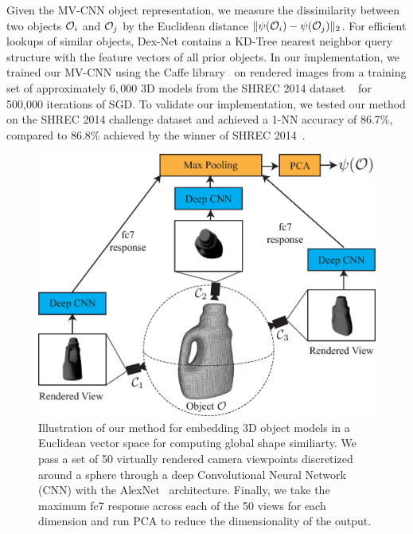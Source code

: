 Given the MV-CNN object representation, we measure the dissimilarity between two objects $\mathcal{O}_i$ and $\mathcal{O}_j$ by the Euclidean distance $\| \psi(\mathcal{O}_i) - \psi(\mathcal{O}_j) \|_2$.
For efficient lookups of similar objects, Dex-Net contains a KD-Tree nearest neighbor query structure with the feature vectors of all prior objects.
In our implementation, we trained our MV-CNN using the Caffe library~\cite{jia2014caffe} on rendered images from a training set of approximately $6,000$ 3D models from the SHREC 2014 dataset ~\cite{li2015comparison} for 500,000 iterations of SGD.
To validate our implementation, we tested our method on the SHREC 2014 challenge dataset and achieved a 1-NN accuracy of 86.7\%, compared to 86.8\% achieved by the winner of SHREC 2014~\cite{li2015comparison}.

\begin{figure}[t!]
\centering
\includegraphics[scale=0.275]{figures/illustrations/cnn_model.eps}
\caption{Illustration of our method for embedding 3D object models in a Euclidean vector space for computing global shape similiarty. We pass a set of 50 virtually rendered camera viewpoints discretized around a sphere through a deep Convolutional Neural Network (CNN) with the AlexNet~\cite{krizhevsky2012imagenet} architecture. Finally, we take the maximum fc7 response across each of the 50 views for each dimension and run PCA to reduce the dimensionality of the output.}
\vspace*{-15pt}
\end{figure}

